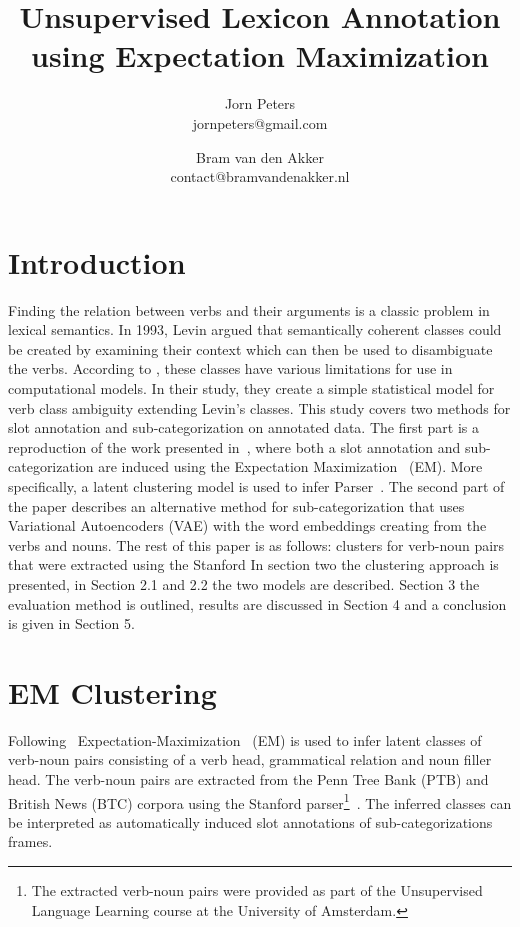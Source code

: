 \documentclass[11pt]{scrartcl}
\title{Unsupervised Lexicon Annotation using Expectation Maximization}
\author{Jorn Peters\\\small{jornpeters@gmail.com} \and Bram van den Akker\\\small{contact@bramvandenakker.nl}}
\begin{document}
\maketitle


\section{Introduction} %
Finding the relation between verbs and their arguments is a classic problem in lexical semantics. In 1993, Levin \cite{levin1993english} argued that semantically coherent classes could be created by examining their context which can then be used to disambiguate the verbs. According to \cite{lapata2004verb}, these classes have various limitations for use in computational models. In their study, they create a simple statistical model for verb class ambiguity extending Levin's classes. This study covers two methods for slot annotation and
sub-categorization on annotated data. The first part is a reproduction of the work presented in~\cite{rooth1999inducing}, where both a slot annotation and
sub-categorization are induced using the
Expectation Maximization~\cite{dempster1977maximum} (EM). More specifically, a latent clustering model is used to infer
Parser~\cite{klein2003accurate}. The second part of the paper describes an alternative method for sub-categorization that uses Variational Autoencoders (VAE) with the word embeddings creating from the verbs and nouns. The rest of this paper is as follows:
clusters for verb-noun pairs that were extracted using the Stanford
In section two the clustering approach is presented, in Section 2.1
and 2.2 the two models are described. Section 3 the evaluation method
is outlined, results are discussed in Section 4 and a conclusion is
given in Section 5. %

\section{EM Clustering} %
Following~\cite{rooth1999inducing}
Expectation-Maximization~\cite{dempster1977maximum} (EM) is used to
infer latent classes of verb-noun pairs consisting of a verb head, grammatical relation and noun filler head. The verb-noun pairs are
extracted from the Penn Tree Bank (PTB) and British News (BTC) corpora
using the Stanford parser\footnote{The extracted verb-noun pairs were
provided as part of the Unsupervised Language Learning course at the
University of Amsterdam.}~\cite{klein2003accurate}.  The inferred
classes can be interpreted as automatically induced slot annotations
of sub-categorizations frames.
\end{document}
